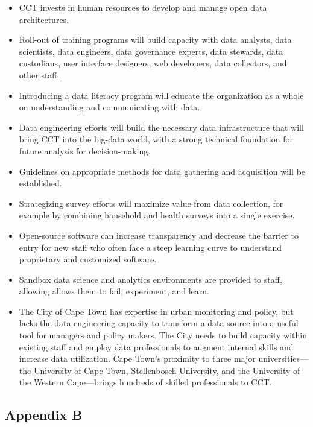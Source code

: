 \begin{itemize}
\tightlist
\item
  CCT invests in human resources to develop and manage open data architectures.
\item
  Roll-out of training programs will build capacity with data analysts, data scientists, data engineers, data governance experts, data stewards, data custodians, user interface designers, web developers, data collectors, and other staff.
\item
  Introducing a data literacy program will educate the organization as a whole on understanding and communicating with data.
\item
  Data engineering efforts will build the necessary data infrastructure that will bring CCT into the big-data world, with a strong technical foundation for future analysis for decision-making.
\item
  Guidelines on appropriate methods for data gathering and acquisition will be established.
\item
  Strategizing survey efforts will maximize value from data collection, for example by combining household and health surveys into a single exercise.
\item
  Open-source software can increase transparency and decrease the barrier to entry for new staff who often face a steep learning curve to understand proprietary and customized software.
\item
  Sandbox data science and analytics environments are provided to staff, allowing allows them to fail, experiment, and learn.
\item
  The City of Cape Town has expertise in urban monitoring and policy, but lacks the data engineering capacity to transform a data source into a useful tool for managers and policy makers. The City needs to build capacity within existing staff and employ data professionals to augment internal skills and increase data utilization. Cape Town's proximity to three major universities---the University of Cape Town, Stellenbosch University, and the University of the Western Cape---brings hundreds of skilled professionals to CCT.
\end{itemize}

\hypertarget{appendix-b-1}{%
\subsection*{Appendix B}\label{appendix-b-1}}

